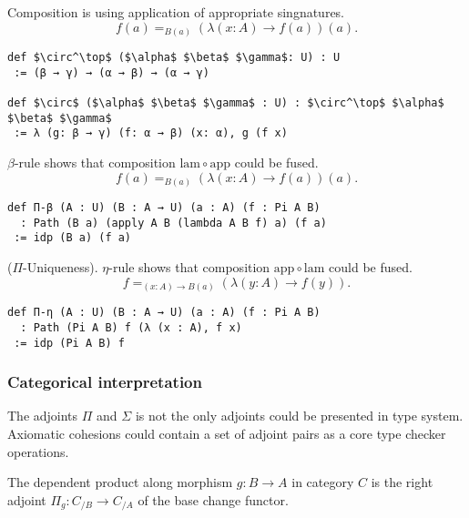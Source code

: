 \documentclass{article}
\begin{document}
\begin{theorem}[$\Pi$-Composition]
Composition is using application of appropriate singnatures.
$$f(a) =_{B(a)} (\lambda (x:A) \rightarrow f(a))(a).$$
\begin{lstlisting}[mathescape=true]
def $\circ^\top$ ($\alpha$ $\beta$ $\gamma$: U) : U
 := (β → γ) → (α → β) → (α → γ)

def $\circ$ ($\alpha$ $\beta$ $\gamma$ : U) : $\circ^\top$ $\alpha$ $\beta$ $\gamma$
 := λ (g: β → γ) (f: α → β) (x: α), g (f x)
\end{lstlisting}
\end{theorem}

\begin{theorem}[$\Pi$-Computation]
$\beta$-rule shows that composition $\mathrm{lam} \circ \mathrm{app}$ could be fused.
$$ f(a) =_{B(a)} (\lambda (x:A) \rightarrow f(a))(a).$$
\begin{lstlisting}[mathescape=true]
def Π-β (A : U) (B : A → U) (a : A) (f : Pi A B)
  : Path (B a) (apply A B (lambda A B f) a) (f a)
 := idp (B a) (f a)
\end{lstlisting}
\end{theorem}

\begin{theorem} ($\Pi$-Uniqueness).
$\eta$-rule shows that composition $\mathrm{app} \circ \mathrm{lam}$ could be fused.
$$ f =_{(x:A)\rightarrow B(a)} (\lambda (y:A) \rightarrow f(y)). $$
\begin{lstlisting}[mathescape=true]
def Π-η (A : U) (B : A → U) (a : A) (f : Pi A B)
  : Path (Pi A B) f (λ (x : A), f x)
 := idp (Pi A B) f
\end{lstlisting}
\end{theorem}

\subsubsection*{Categorical interpretation}

The adjoints $\Pi$ and $\Sigma$ is not the only adjoints could be presented in type system.
Axiomatic cohesions could contain a set of adjoint pairs as a core type checker operations.

\begin{definition}
The dependent product along morphism $g: B \rightarrow A$ in category $C$ is the right
adjoint $\Pi_g : C_{/B} \rightarrow C_{/A}$ of the base change functor.
\end{definition}
\end{document}
